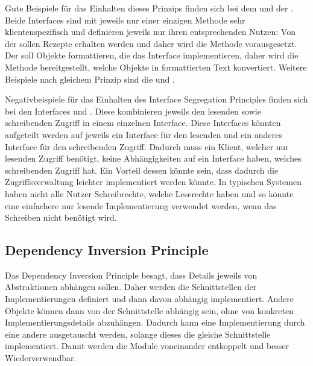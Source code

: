 Gute Beispiele für das Einhalten dieses Prinzips finden sich bei dem  und der . Beide Interfaces sind mit jeweils nur einer einzigen Methode sehr klientenspezifisch und definieren jeweils nur ihren entsprechenden Nutzen: Von der  sollen Rezepte erhalten werden und daher wird die Methode  vorausgesetzt. Der  soll Objekte formattieren, die das Interface  implementieren, daher wird die Methode  bereitgestellt, welche Objekte in formattierten Text konvertiert. Weitere Beispiele nach gleichem Prinzip sind die  und . 

Negativbeispiele für das Einhalten des Interface Segregation Principles finden sich bei den Interfaces  und . Diese kombinieren jeweils den lesenden sowie schreibenden Zugriff in einem einzelnen Interface. Diese Interfaces könnten aufgeteilt werden auf jeweils ein Interface für den lesenden und ein anderes Interface für den schreibenden Zugriff. Dadurch muss ein Klient, welcher nur lesenden Zugriff benötigt, keine Abhängigkeiten auf ein Interface haben, welches schreibenden Zugriff hat. Ein Vorteil dessen könnte sein, dass dadurch die Zugriffsverwaltung leichter implementiert werden könnte. In typischen Systemen haben nicht alle Nutzer Schreibrechte, welche Leserechte haben und so könnte eine einfachere nur lesende Implementierung verwendet werden, wenn das Schreiben nicht benötigt wird.

\subsection{Dependency Inversion Principle}
Das Dependency Inversion Principle besagt, dass Details jeweils von Abstraktionen abhängen sollen. Daher werden die Schnittstellen der Implementierungen definiert und dann davon abhängig implementiert. Andere Objekte können dann von der Schnittstelle abhängig sein, ohne von konkreten Implementierungsdetails abzuhängen. Dadurch kann eine Implementierung durch eine andere ausgetauscht werden, solange dieses die gleiche Schnittstelle implementiert. Damit werden die Module voneinander entkoppelt und besser Wiederverwendbar.

